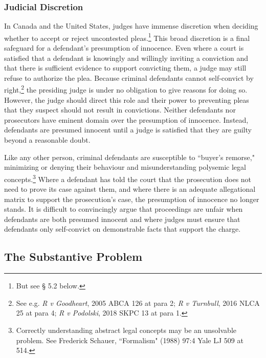 \subsubsection{Judicial Discretion}

In Canada and the United States, judges have immense discretion when deciding whether to accept or reject uncontested pleas.\footnote{But see § 5.2 below.} This broad discretion is a final safeguard for a defendant's presumption of innocence. Even where a court is satisfied that a defendant is knowingly and willingly inviting a conviction and that there is sufficient evidence to support convicting them, a judge may still refuse to authorize the plea. Because criminal defendants cannot self-convict by right,\footnote{See e.g. \textit{R v Goodheart}, 2005 ABCA 126 at para 2; \textit{R v Turnbull}, 2016 NLCA 25 at para 4; \textit{R v Podolski}, 2018 SKPC 13 at para 1.} the presiding judge is under no obligation to give reasons for doing so. However, the judge should direct this role and their power to preventing pleas that they suspect should not result in convictions. Neither defendants nor prosecutors have eminent domain over the presumption of innocence. Instead, defendants are presumed innocent until a judge is satisfied that they are guilty beyond a reasonable doubt.

Like any other person, criminal defendants are susceptible to ``buyer's remorse," minimizing or denying their behaviour and misunderstanding polysemic legal concepts.\footnote{Correctly understanding abstract legal concepts may be an unsolvable problem. See Frederick Schauer, ``Formalism" (1988) 97:4 Yale LJ 509 at 514.} Where a defendant has told the court that the prosecution does not need to prove its case against them, and where there is an adequate allegational matrix to support the prosecution's case, the presumption of innocence no longer stands. It is difficult to convincingly argue that proceedings are unfair when defendants are both presumed innocent and where judges must ensure that defendants only self-convict on demonstrable facts that support the charge.

\subsection{The Substantive Problem}


